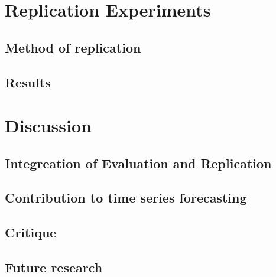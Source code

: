 \documentclass[letterpaper,twocolumn,12pt]{article}
\begin{document}
    \section{Replication Experiments}

    \subsection{Method of replication}

    \subsection{Results}


    \section{Discussion}

    \subsection{Integreation of Evaluation and Replication}

    \subsection{Contribution to time series forecasting}

    \subsection{Critique}
    \subsection{Future research}

    {\footnotesize 
    }


    \theendnotes
\end{document}
